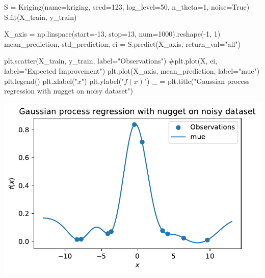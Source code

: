 \documentclass[
  letterpaper,
  DIV=11,
  numbers=noendperiod]{scrreprt}
\newenvironment{Shaded}{\begin{snugshade}}{\end{snugshade}}
\newcommand{\CommentTok}[1]{\textcolor[rgb]{0.37,0.37,0.37}{#1}}
\newcommand{\DecValTok}[1]{\textcolor[rgb]{0.68,0.00,0.00}{#1}}
\newcommand{\NormalTok}[1]{\textcolor[rgb]{0.00,0.23,0.31}{#1}}
\newcommand{\OperatorTok}[1]{\textcolor[rgb]{0.37,0.37,0.37}{#1}}
\newcommand{\StringTok}[1]{\textcolor[rgb]{0.13,0.47,0.30}{#1}}
\newcommand{\VariableTok}[1]{\textcolor[rgb]{0.07,0.07,0.07}{#1}}
\begin{document}
\begin{Shaded}
\begin{Highlighting}[]
\NormalTok{S }\OperatorTok{=}\NormalTok{ Kriging(name}\OperatorTok{=}\StringTok{\textquotesingle{}kriging\textquotesingle{}}\NormalTok{,}
\NormalTok{            seed}\OperatorTok{=}\DecValTok{123}\NormalTok{,}
\NormalTok{            log\_level}\OperatorTok{=}\DecValTok{50}\NormalTok{,}
\NormalTok{            n\_theta}\OperatorTok{=}\DecValTok{1}\NormalTok{,}
\NormalTok{            noise}\OperatorTok{=}\VariableTok{True}\NormalTok{)}
\NormalTok{S.fit(X\_train, y\_train)}

\NormalTok{X\_axis }\OperatorTok{=}\NormalTok{ np.linspace(start}\OperatorTok{={-}}\DecValTok{13}\NormalTok{, stop}\OperatorTok{=}\DecValTok{13}\NormalTok{, num}\OperatorTok{=}\DecValTok{1000}\NormalTok{).reshape(}\OperatorTok{{-}}\DecValTok{1}\NormalTok{, }\DecValTok{1}\NormalTok{)}
\NormalTok{mean\_prediction, std\_prediction, ei }\OperatorTok{=}\NormalTok{ S.predict(X\_axis, return\_val}\OperatorTok{=}\StringTok{"all"}\NormalTok{)}

\NormalTok{plt.scatter(X\_train, y\_train, label}\OperatorTok{=}\StringTok{"Observations"}\NormalTok{)}
\CommentTok{\#plt.plot(X, ei, label="Expected Improvement")}
\NormalTok{plt.plot(X\_axis, mean\_prediction, label}\OperatorTok{=}\StringTok{"mue"}\NormalTok{)}
\NormalTok{plt.legend()}
\NormalTok{plt.xlabel(}\StringTok{"$x$"}\NormalTok{)}
\NormalTok{plt.ylabel(}\StringTok{"$f(x)$"}\NormalTok{)}
\NormalTok{\_ }\OperatorTok{=}\NormalTok{ plt.title(}\StringTok{"Gaussian process regression with nugget on noisy dataset"}\NormalTok{)}
\end{Highlighting}
\end{Shaded}

\includegraphics{012_num_spot_ei_files/figure-pdf/cell-56-output-1.pdf}
\end{document}
